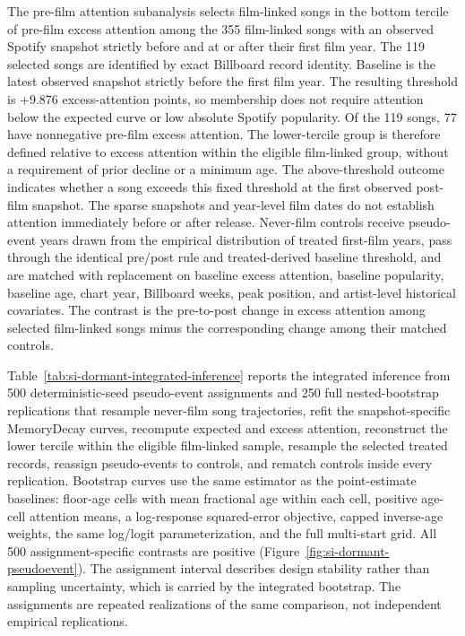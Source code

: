 \documentclass[11pt]{article}
\begin{document}
The pre-film attention subanalysis selects film-linked songs in the bottom tercile of pre-film excess attention among the 355 film-linked songs with an observed Spotify snapshot strictly before and at or after their first film year. The 119 selected songs are identified by exact Billboard record identity. Baseline is the latest observed snapshot strictly before the first film year. The resulting threshold is +9.876 excess-attention points, so membership does not require attention below the expected curve or low absolute Spotify popularity. Of the 119 songs, 77 have nonnegative pre-film excess attention. The lower-tercile group is therefore defined relative to excess attention within the eligible film-linked group, without a requirement of prior decline or a minimum age. The above-threshold outcome indicates whether a song exceeds this fixed threshold at the first observed post-film snapshot. The sparse snapshots and year-level film dates do not establish attention immediately before or after release. Never-film controls receive pseudo-event years drawn from the empirical distribution of treated first-film years, pass through the identical pre/post rule and treated-derived baseline threshold, and are matched with replacement on baseline excess attention, baseline popularity, baseline age, chart year, Billboard weeks, peak position, and artist-level historical covariates. The contrast is the pre-to-post change in excess attention among selected film-linked songs minus the corresponding change among their matched controls.

Table~\ref{tab:si-dormant-integrated-inference} reports the integrated inference from 500 deterministic-seed pseudo-event assignments and 250 full nested-bootstrap replications that resample never-film song trajectories, refit the snapshot-specific MemoryDecay curves, recompute expected and excess attention, reconstruct the lower tercile within the eligible film-linked sample, resample the selected treated records, reassign pseudo-events to controls, and rematch controls inside every replication. Bootstrap curves use the same estimator as the point-estimate baselines: floor-age cells with mean fractional age within each cell, positive age-cell attention means, a log-response squared-error objective, capped inverse-age weights, the same log/logit parameterization, and the full multi-start grid. All 500 assignment-specific contrasts are positive (Figure~\ref{fig:si-dormant-pseudoevent}). The assignment interval describes design stability rather than sampling uncertainty, which is carried by the integrated bootstrap. The assignments are repeated realizations of the same comparison, not independent empirical replications.
\end{document}
